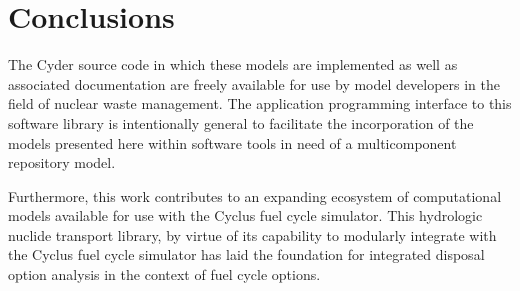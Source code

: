 \documentclass{anstrans}
\begin{document}
\section{Conclusions}
The Cyder source code in which these models are implemented as well as 
associated documentation are freely available for use by model developers in the 
field of nuclear waste management. The application programming interface to this 
software library is intentionally general to facilitate the incorporation of the 
models presented here within software tools in need of a multicomponent repository 
model.

Furthermore, this work contributes to an expanding ecosystem of computational 
models available for use with the Cyclus fuel cycle simulator. This hydrologic 
nuclide transport library, by virtue of its capability to modularly integrate 
with the Cyclus fuel cycle simulator has laid the foundation for integrated 
disposal option analysis in the context of fuel cycle options. 



\end{document}
